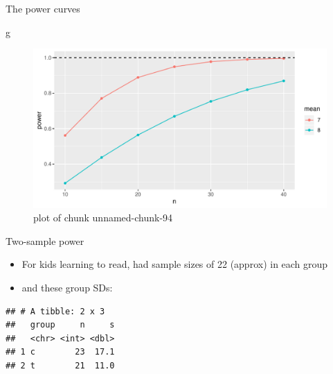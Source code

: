 \documentclass[
  ignorenonframetext,
]{beamer}
\newenvironment{Shaded}{\begin{snugshade}}{\end{snugshade}}
\newcommand{\DataTypeTok}[1]{\textcolor[rgb]{0.13,0.29,0.53}{#1}}
\newcommand{\KeywordTok}[1]{\textcolor[rgb]{0.13,0.29,0.53}{\textbf{#1}}}
\newcommand{\NormalTok}[1]{#1}
\newcommand{\OperatorTok}[1]{\textcolor[rgb]{0.81,0.36,0.00}{\textbf{#1}}}
\newcommand{\StringTok}[1]{\textcolor[rgb]{0.31,0.60,0.02}{#1}}
\providecommand{\tightlist}{%
  \setlength{\itemsep}{0pt}\setlength{\parskip}{0pt}}
\begin{document}
\begin{frame}[fragile]{The power curves}
\protect\hypertarget{the-power-curves-1}{}

\begin{Shaded}
\begin{Highlighting}[]
\NormalTok{g}
\end{Highlighting}
\end{Shaded}

\begin{figure}
\centering
\includegraphics{figure/unnamed-chunk-94-1.pdf}
\caption{plot of chunk unnamed-chunk-94}
\end{figure}

\end{frame}

\begin{frame}[fragile]{Two-sample power}
\protect\hypertarget{two-sample-power}{}

\begin{itemize}
\tightlist
\item
  For kids learning to read, had sample sizes of 22 (approx) in each
  group
\item
  and these group SDs:
\end{itemize}

\begin{Shaded}
\end{Shaded}

\begin{verbatim}
## # A tibble: 2 x 3
##   group     n     s
##   <chr> <int> <dbl>
## 1 c        23  17.1
## 2 t        21  11.0
\end{verbatim}

\end{frame}
\end{document}
